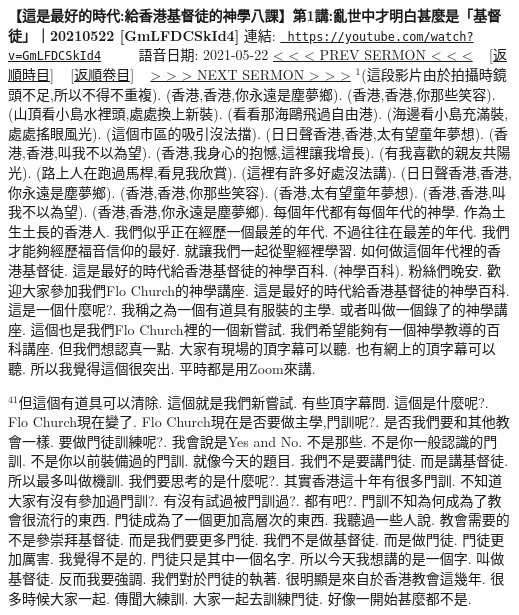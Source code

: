 \documentclass{book}
\begin{document}
\section{}
\label{sec:GmLFDCSkId4}
\textbf{【這是最好的時代:給香港基督徒的神學八課】第1講:亂世中才明白甚麼是「基督徒」｜20210522 [GmLFDCSkId4]}
\newline
\newline
連結: \href{https://youtube.com/watch?v=GmLFDCSkId4}{\texttt{ https://youtube.com/watch?v=GmLFDCSkId4}} ~~~~ 語音日期: 2021-05-22 
\newline
\newline
\hyperref[sec:hx9eq2tkbx4]{\small{< < < PREV SERMON < < <}}
~
\hyperref[sec:index_chronic]{\small{[返順時目]}}
~
\hyperref[sec:index_scriptual]{\small{[返順卷目]}}
~
\hyperref[sec:k_0V9RXlAGE]{\small{> > > NEXT SERMON > > >}}
\newline
\newline
$^{1}$(這段影片由於拍攝時鏡頭不足,所以不得不重複).
(香港,香港,你永遠是塵夢鄉).
(香港,香港,你那些笑容).
(山頂看小島水裡頭,處處換上新裝).
(看看那海鷗飛過自由港).
(海邊看小島充滿裝,處處搖眼風光).
(這個市區的吸引沒法擋).
(日日聲香港,香港,太有望童年夢想).
(香港,香港,叫我不以為望).
(香港,我身心的抱憾,這裡讓我增長).
(有我喜歡的親友共陽光).
(路上人在跑過馬桿,看見我欣賞).
(這裡有許多好處沒法講).
(日日聲香港,香港,你永遠是塵夢鄉).
(香港,香港,你那些笑容).
(香港,太有望童年夢想).
(香港,香港,叫我不以為望).
(香港,香港,你永遠是塵夢鄉).
每個年代都有每個年代的神學.
作為土生土長的香港人.
我們似乎正在經歷一個最差的年代.
不過往往在最差的年代.
我們才能夠經歷福音信仰的最好.
就讓我們一起從聖經裡學習.
如何做這個年代裡的香港基督徒.
這是最好的時代給香港基督徒的神學百科.
(神學百科).
粉絲們晚安.
歡迎大家參加我們Flo Church的神學講座.
這是最好的時代給香港基督徒的神學百科.
這是一個什麼呢?.
我稱之為一個有道具有服裝的主學.
或者叫做一個錄了的神學講座.
這個也是我們Flo Church裡的一個新嘗試.
我們希望能夠有一個神學教導的百科講座.
但我們想認真一點.
大家有現場的頂字幕可以聽.
也有網上的頂字幕可以聽.
所以我覺得這個很突出.
平時都是用Zoom來講.

$^{41}$但這個有道具可以清除.
這個就是我們新嘗試.
有些頂字幕問.
這個是什麼呢?.
Flo Church現在變了.
Flo Church現在是否要做主學,門訓呢?.
是否我們要和其他教會一樣.
要做門徒訓練呢?.
我會說是Yes and No.
不是那些.
不是你一般認識的門訓.
不是你以前裝備過的門訓.
就像今天的題目.
我們不是要講門徒.
而是講基督徒.
所以最多叫做機訓.
我們要思考的是什麼呢?.
其實香港這十年有很多門訓.
不知道大家有沒有參加過門訓?.
有沒有試過被門訓過?.
都有吧?.
門訓不知為何成為了教會很流行的東西.
門徒成為了一個更加高層次的東西.
我聽過一些人說.
教會需要的不是參崇拜基督徒.
而是我們要更多門徒.
我們不是做基督徒.
而是做門徒.
門徒更加厲害.
我覺得不是的.
門徒只是其中一個名字.
所以今天我想講的是一個字.
叫做基督徒.
反而我要強調.
我們對於門徒的執著.
很明顯是來自於香港教會這幾年.
很多時候大家一起.
傳聞大練訓.
大家一起去訓練門徒.
好像一開始甚麼都不是.
\end{document}
